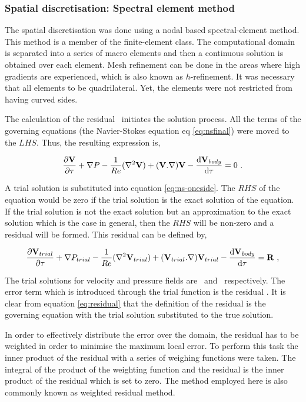 \subsubsection{Spatial discretisation: Spectral element method}
 
 The spatial discretisation was done using a nodal based spectral-element method. This method is a member of the finite-element class. The computational domain is separated into a series of macro elements and then a continuous solution is obtained over each element. Mesh refinement can be done in the areas where high gradients are experienced, which is also known as $h$-refinement. It was necessary that all elements to be quadrilateral. Yet, the elements were not restricted from having curved sides.
 
 The calculation of the residual \residual\ initiates the solution process. All the terms of the governing equations (the Navier-Stokes equation eq \ref{eq:nsfinal}) were moved to the $LHS$. Thus, the resulting expression is, 
 
 \begin{equation} \centering
 \label{eq:ns-oneside}
 \pderiv{\vecV}{\tau} + \grad{\Pres} - \frac{1}{\reynoldsnumber}(\gradsq{\vecV}) + (\vecV.\nabla)\vecV - \accframe = 0 ~.
 \end{equation}
 
 A trial solution is substituted into equation \ref{eq:ns-oneside}. The $RHS$ of the equation would be zero if the trial solution is the exact solution of the equation. If the trial solution is not the exact solution but an approximation to the exact solution which is the case in general, then the $RHS$ will be non-zero and a residual will be formed. This residual can be defined by, 
 
 \begin{equation} \centering
 \label{eq:residual}
 \pderiv{\Vtrial}{\tau} +\grad{\Ptrial} - \frac{1}{\reynoldsnumber}(\gradsq{\Vtrial}) + (\Vtrial.\nabla)\Vtrial - \accframe = \residual ~,
 \end{equation}
 
 The trial solutions for velocity and pressure fields are \Vtrial\ and \Ptrial\ respectively. The error term which is introduced through the trial function is the residual \residual. It is clear from equation \ref{eq:residual} that the definition of the residual is the governing equation with the trial solution substituted to the true solution.
 
In order to effectively distribute the error over the domain, the residual has to be weighted in order to minimise the maximum local error. To perform this task the inner product of the residual with a series of weighing functions were taken. The integral of the product of the weighting  function and the residual is the inner product of the residual which is set to zero. The method employed here is also commonly known as weighted residual method. 

